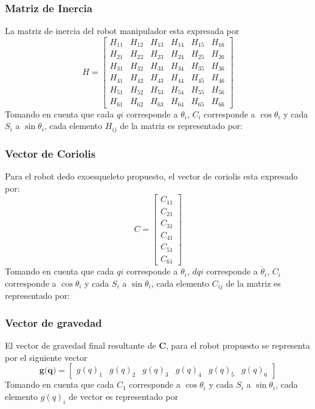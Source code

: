 \subsubsection{Matriz de Inercia}
La matriz de inercia del robot manipulador esta expresada por 
\begin{equation*}
    H=\begin{bmatrix} H_{11} & H_{12} & H_{13} & H_{14} & H_15 & H_{16}\\
    H_{21} & H_{22} & H_{23} & H_{24} & H_25 & H_{26}\\
    H_{31} & H_{32} & H_{33} & H_{34} & H_35 & H_{36}\\
    H_{41} & H_{42} & H_{43} & H_{44} & H_45 & H_{46}\\
    H_{51} & H_{52} & H_{53} & H_{54} & H_55 & H_{56}\\
    H_{61} & H_{62} & H_{63} & H_{64} & H_65 & H_{66}
\end{bmatrix}
\end{equation*}
\noindent Tomando en cuenta que cada $qi$ corresponde a $\theta_i$, $C_i$ corresponde a $\cos \theta_i$ y cada $S_i$ a
$\sin \theta_i$, cada elemento $H_{ij}$ de la matriz es representado por:

\subsubsection{Vector de Coriolis}
Para el robot dedo exoesqueleto propuesto, el vector de coriolis esta expresado por:
\begin{equation*}
    C=\begin{bmatrix} C_{11}\\
                    C_{21}\\
                    C_{31}\\
                    C_{41}\\
                    C_{51}\\
                    C_{61}\end{bmatrix}
\end{equation*}
\noindent Tomando en cuenta que cada $qi$ corresponde a $\theta_i$, $dqi$ corresponde a $\dot{\theta_i}$, $C_i$ corresponde
a $\cos \theta_i$ y cada $S_i$ a $\sin \theta_i$, cada elemento $C_{ij}$ de la matriz es representado por:


\subsubsection{Vector de gravedad}
El vector de gravedad final resultante de $\textbf{C}$, para el robot propuesto se representa por el siguiente vector
\begin{equation*}
    \textbf{g(q)}= \begin{bmatrix} g(q)_1 & g(q)_2 & g(q)_3 & g(q)_4 &g(q)_5 & g(q)_6  \end{bmatrix}
\end{equation*}
Tomando en cuenta que cada $C_1$ corresponde a $\cos \theta_i$ y cada $S_i$ a $\sin \theta_i$, cada  elemento $g(q)_i$ de
vector es representado por 